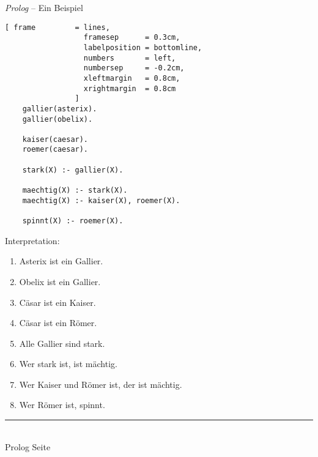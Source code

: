 \documentclass{slides}
\newcommand{\myrule}{\rule{20cm}{1mm}\\ }
\newcounter{mypage}
\begin{document}
\begin{slide}{}
\normalsize
\begin{center}
\textsl{Prolog} -- Ein Beispiel 
\end{center}
\vspace{0.5cm}

\footnotesize
\begin{Verbatim}[ frame         = lines, 
                  framesep      = 0.3cm, 
                  labelposition = bottomline,
                  numbers       = left,
                  numbersep     = -0.2cm,
                  xleftmargin   = 0.8cm,
                  xrightmargin  = 0.8cm
                ]
    gallier(asterix).
    gallier(obelix).

    kaiser(caesar).
    roemer(caesar).

    stark(X) :- gallier(X).

    maechtig(X) :- stark(X).
    maechtig(X) :- kaiser(X), roemer(X).

    spinnt(X) :- roemer(X).
\end{Verbatim}

Interpretation:
\begin{enumerate}
\item Asterix ist ein Gallier.
\item Obelix ist ein Gallier.
\item Cäsar ist ein Kaiser.
\item Cäsar ist ein Römer.
\item Alle Gallier sind stark.
\item Wer stark ist, ist mächtig.
\item Wer Kaiser und Römer ist, der ist mächtig.
\item Wer Römer ist, spinnt. 
\end{enumerate}



\vspace*{\fill}
\tiny \addtocounter{mypage}{1}
\myrule
Prolog  \hspace*{\fill} Seite 
\end{slide}


\end{document}
